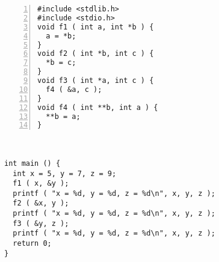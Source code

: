 \documentclass[10pt, sansserif,
               firstcolor=color1,
               secondcolor=color2,
               logo=logo-TN, 
               footband=bandeau-TN]{TelecomNancy}
\begin{document}

\vspace{-\baselineskip}

\bigskip\noindent
  \begin{minipage}[t]{.35\linewidth}
  \begin{Verbatim}[label=Programme 4.1 (début),numbers=left]
#include <stdlib.h>
#include <stdio.h>
void f1 ( int a, int *b ) {
  a = *b;
}
void f2 ( int *b, int c ) {
  *b = c;
}
void f3 ( int *a, int c ) {
  f4 ( &a, c );
}
void f4 ( int **b, int a ) {
  **b = a;
}
  \end{Verbatim}
  \end{minipage}~~~~
  \begin{minipage}[t]{.6\linewidth}
  \begin{Verbatim}[label=Programme 4.1 (fin),numbers=right,firstnumber=last]
int main () {
  int x = 5, y = 7, z = 9;
  f1 ( x, &y );
  printf ( "x = %d, y = %d, z = %d\n", x, y, z );
  f2 ( &x, y );
  printf ( "x = %d, y = %d, z = %d\n", x, y, z );
  f3 ( &y, z );
  printf ( "x = %d, y = %d, z = %d\n", x, y, z );
  return 0;
}    
  \end{Verbatim}    
  \end{minipage}


  
\bigskip
\noindent
{}
\end{document}
